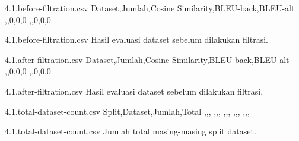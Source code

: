 \begin{filecontents*}{4.1.before-filtration.csv}
  Dataset,Jumlah,Cosine Similarity,BLEU-back,BLEU-alt
  ,,0,0,0
  ,,0,0,0
\end{filecontents*}
  {4.1.before-filtration.csv}
  {Hasil evaluasi dataset sebelum dilakukan filtrasi.}

\begin{filecontents*}{4.1.after-filtration.csv}
  Dataset,Jumlah,Cosine Similarity,BLEU-back,BLEU-alt
  ,,0,0,0
  ,,0,0,0
\end{filecontents*}
  {4.1.after-filtration.csv}
  {Hasil evaluasi dataset sebelum dilakukan filtrasi.}

\begin{filecontents*}{4.1.total-dataset-count.csv}
  Split,Dataset,Jumlah,Total
  ,,,
  ,,,
  ,,,
  ,,,
  ,,,
\end{filecontents*}
  {4.1.total-dataset-count.csv}
  {Jumlah total masing-masing split dataset.}

